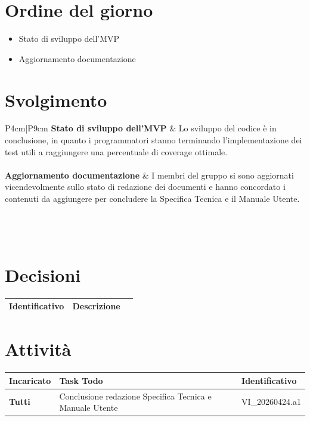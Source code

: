 \documentclass[a4paper,12pt]{article}
\begin{document}


\newpage
\tableofcontents
\newpage

\markright{}

\newpage
\section{Ordine del giorno}

\begin{itemize}
    \item Stato di sviluppo dell'MVP
    \item Aggiornamento documentazione
\end{itemize}

\section{Svolgimento}
\begin{longtable}{P{4cm}|P{9cm}}
\textbf{Stato di sviluppo dell'MVP} & Lo sviluppo del codice è in conclusione, in quanto i programmatori stanno terminando l'implementazione dei test utili a raggiungere una percentuale di coverage ottimale.\\
\\
\textbf{Aggiornamento documentazione} & 
I membri del gruppo si sono aggiornati vicendevolmente sullo stato di redazione dei documenti e hanno concordato i contenuti da aggiungere per concludere la Specifica Tecnica e il Manuale Utente.\\
\\
\\
\\
\end{longtable}

\section{Decisioni} {
        \begin{tabularx}{\textwidth}{|l|X|l|}
            \hline
            \textbf{Identificativo} & \textbf{Descrizione}\\
            \hline
        \end{tabularx}
    }

\section{Attività} {
        \begin{tabularx}{\textwidth}{|>{\raggedright\arraybackslash}p{4cm}|X|l|}
            \hline
            \textbf{Incaricato} & \textbf{Task Todo} & \textbf{Identificativo} \\
            \hline
            \textbf{Tutti} & Conclusione redazione Specifica Tecnica e Manuale Utente & VI\_20260424.a1 \\
            \hline
        \end{tabularx}
}
\end{document}
